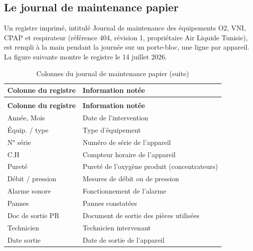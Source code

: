 \subsection{Le journal de maintenance papier}

Un registre imprimé, intitulé \og{}Journal de maintenance des équipements O2, VNI, CPAP et respirateur\fg{} (référence 404, révision 1, propriétaire Air Liquide Tunisie), est rempli à la main pendant la journée sur un porte-bloc, une ligne par appareil. La figure suivante montre le registre le 14 juillet 2026.


{\small{}\renewcommand{\arraystretch}{1.3}
\begin{longtable}{|>{\raggedright\arraybackslash}p{4.57cm}|>{\raggedright\arraybackslash}p{10.04cm}|}
\caption{Colonnes du journal de maintenance papier}\\
\hline
\rowcolor{ALbleu} \sffamily\bfseries\color{white} Colonne du registre & \sffamily\bfseries\color{white} Information notée \\ \hline
\endfirsthead
\caption[]{Colonnes du journal de maintenance papier (suite)}\\
\hline
\rowcolor{ALbleu} \sffamily\bfseries\color{white} Colonne du registre & \sffamily\bfseries\color{white} Information notée \\ \hline
\endhead
Année, Mois & Date de l'intervention \\ \hline
\rowcolor{ALgris} Équip. / type & Type d'équipement \\ \hline
N° série & Numéro de série de l'appareil \\ \hline
\rowcolor{ALgris} C.H & Compteur horaire de l'appareil \\ \hline
Pureté & Pureté de l'oxygène produit (concentrateurs) \\ \hline
\rowcolor{ALgris} Débit / pression & Mesures de débit ou de pression \\ \hline
Alarme sonore & Fonctionnement de l'alarme \\ \hline
\rowcolor{ALgris} Pannes & Pannes constatées \\ \hline
Doc de sortie PR & Document de sortie des pièces utilisées \\ \hline
\rowcolor{ALgris} Technicien & Technicien intervenant \\ \hline
Date sortie & Date de sortie de l'appareil \\ \hline
\end{longtable}
}


